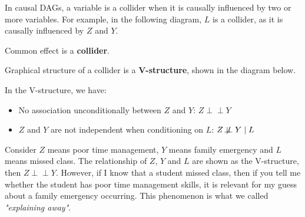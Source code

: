 
In causal DAGs, a variable is a collider when it is causally influenced by two or more variables. For example, in the following diagram, $L$ is a collider, as it is causally influenced by $Z$ and $Y$.

\begin{center}
\end{center}

\begin{definition} [collider]
Common effect is a \textbf{collider}.
\end{definition}

\begin{definition}
    Graphical structure of a collider is a \textbf{V-structure}, shown in the diagram below.
\end{definition} 

\begin{center}
\end{center}

In the V-structure, we have:
\begin{itemize}
    \item No association unconditionally between $Z$ and $Y$: $Z \perp\!\!\!\perp Y$
    \item $Z$ and $Y$ are not independent when conditioning on $L$: $Z \not\!\perp\!\!\!\perp Y \mid L$
\end{itemize}

\begin{example}
    Consider $Z$ means poor time management, $Y$ means family emergency and $L$ means missed class. The relationship of $Z$, $Y$ and $L$ are shown as the V-structure, then $Z \perp\!\!\!\perp Y$. However, if I know that a student missed class, then if you tell me whether the student has poor time management skills, it is relevant for my guess about a family emergency occurring.  This phenomenon is what we called  \textit{"explaining away"}.
\end{example}

